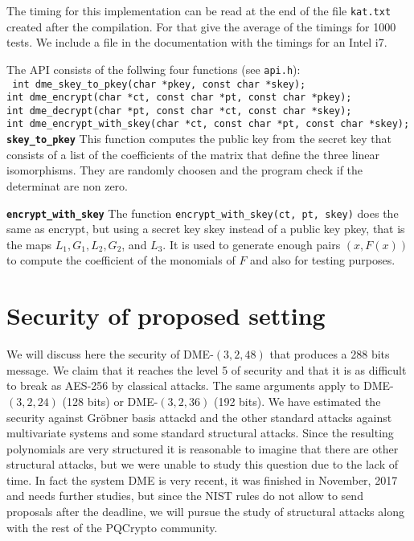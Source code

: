 \documentclass[12pt,a4paper]{amsart}
\theoremstyle{remark}
\theoremstyle{definition}
\begin{document}
The timing for this implementation can be read at the end of the file
\texttt{kat.txt} created after the compilation.
For that give the average of the timings for 1000 tests. We include a file 
in the documentation with the timings for an Intel i7.

The API consists of the follwing four functions (see \texttt{api.h}):\\
\texttt{
        int dme\_skey\_to\_pkey(char *pkey, const char *skey);\\
        int dme\_encrypt(char *ct, const char *pt, const char *pkey);\\
        int dme\_decrypt(char *pt, const char *ct, const char *skey);\\
        int dme\_encrypt\_with\_skey(char *ct, const char *pt, const char *skey);\\
}
\textbf{\texttt{skey\_to\_pkey}}
 This function computes the public key from the secret key that consists of
a list of the coefficients of the matrix that
 define the three linear isomorphisms. They are randomly choosen and the
program check if the determinat are non zero.

\textbf{\texttt{encrypt\_with\_skey}}
The function \texttt{encrypt\_with\_skey(ct, pt, skey)} does the same as encrypt,
but using a secret key skey instead of a public key pkey, that is the
maps $L_1, G_1, L_2, G_2$, and $L_3.$ It is used
to generate enough pairs $(x,F(x))$ to compute the coefficient of the
monomials of $F$ and also for testing purposes.

\section*{Security of proposed setting}
We will discuss here the security of DME-$(3,2,48)$ that produces a 288 bits message. We claim that it reaches the level 5 of security 
and that it is as difficult to break as AES-256 by classical attacks. The same arguments apply to DME-$(3,2,24)$ (128 bits) or  
DME-$(3,2,36)$ (192 bits). We have estimated the security against Gr\"obner basis attackd and the other standard attacks against multivariate
systems and some standard structural attacks. Since the resulting polynomials are very structured it is reasonable to imagine that 
there are other structural attacks, but we were unable to study this question due to the lack of time. In fact the system DME is very recent, 
it was finished in November, 2017 and needs further studies, but since the NIST rules do not allow to send proposals after the deadline, 
we will pursue the study of structural attacks along with the rest of the PQCrypto community.
\end{document}
